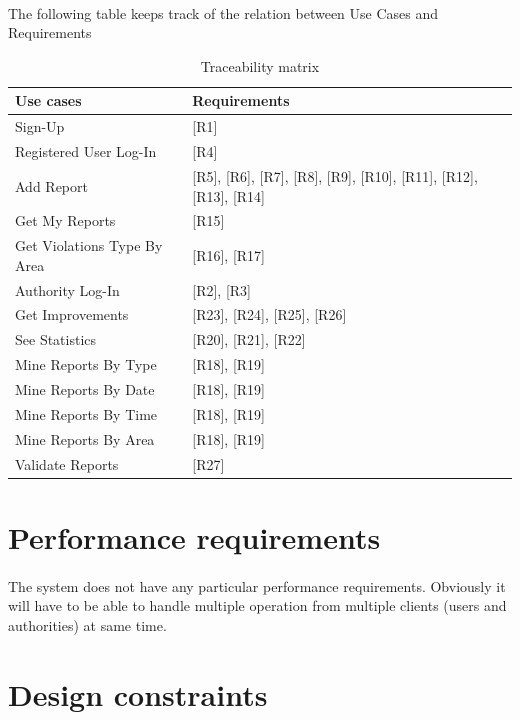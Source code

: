 				\paragraph{}
					The following table keeps track of the relation between Use Cases and Requirements
				\begin{table}[!h]
					\centering
					\begin{tabular}{lL{0.55\textwidth}}
						\toprule
							\textbf{Use cases} & \textbf{Requirements} \\
						\midrule
							Sign-Up & {[R1]} \\
							Registered User Log-In & {[R4]} \\
							Add Report & {[R5]}, {[R6]}, {[R7]}, {[R8]}, {[R9]}, {[R10]}, {[R11]}, {[R12]}, {[R13]}, {[R14]} \\
							Get My Reports & {[R15]} \\
							Get Violations Type By Area & {[R16]}, {[R17]} \\
							Authority Log-In & {[R2]}, {[R3]} \\
							Get Improvements & {[R23]}, {[R24]}, {[R25]}, {[R26]} \\
							See Statistics & {[R20]}, {[R21]}, {[R22]} \\
							Mine Reports By Type & {[R18]}, {[R19]} \\
							Mine Reports By Date & {[R18]}, {[R19]} \\
							Mine Reports By Time & {[R18]}, {[R19]} \\
							Mine Reports By Area & {[R18]}, {[R19]} \\
							Validate Reports & {[R27]} \\
						\bottomrule
					\end{tabular}
					\caption{Traceability matrix}
				\end{table}
		\section{Performance requirements}
			\paragraph{}
				The system does not have any particular performance requirements. Obviously it will have to be able to handle multiple operation from multiple clients (users and authorities) at same time.
		\section{Design constraints}
